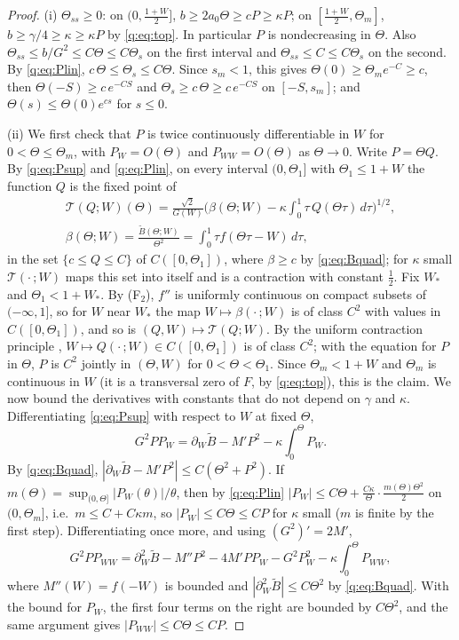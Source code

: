 \documentclass[11pt]{amsart}
\theoremstyle{definition}
\theoremstyle{remark}
\begin{document}
\begin{proof}
(i) $\Theta_{ss}\ge0$: on $(0,\frac{1+W}2]$, $b\ge2a_0\Theta\ge cP\ge\kappa P$; on
$[\frac{1+W}2,\Theta_m]$, $b\ge\gamma/4\ge\kappa\ge\kappa P$ by \eqref{q:eq:top}. In particular $P$ is
nondecreasing in $\Theta$. Also $\Theta_{ss}\le b/G^2\le C\Theta\le C\Theta_s$ on the first interval
and $\Theta_{ss}\le C\le C\Theta_s$ on the second. By \eqref{q:eq:Plin}, $c\,\Theta\le\Theta_s\le C\Theta$. Since $s_m<1$, this gives
$\Theta(0)\ge\Theta_me^{-C}\ge c$, then $\Theta(-S)\ge c\,e^{-CS}$ and
$\Theta_s\ge c\,\Theta\ge c\,e^{-CS}$ on $[-S,s_m]$; and $\Theta(s)\le\Theta(0)e^{cs}$ for $s\le0$.

(ii) We first check that $P$ is twice continuously differentiable in $W$ for
$0<\Theta\le\Theta_m$, with $P_W=O(\Theta)$ and $P_{WW}=O(\Theta)$ as $\Theta\to0$. Write
$P=\Theta Q$. By \eqref{q:eq:Psup} and \eqref{q:eq:Plin}, on every interval $(0,\Theta_1]$
with $\Theta_1\le1+W$ the function $Q$ is the fixed point of
\begin{gather*}
\mathcal T(Q;W)(\Theta)=\frac{\sqrt2}{G(W)}\Big(\beta(\Theta;W)-\kappa\int_0^1\tau\,Q(\Theta\tau)\,d\tau\Big)^{1/2},\\
\beta(\Theta;W)=\frac{\tilde B(\Theta;W)}{\Theta^2}=\int_0^1\tau f(\Theta\tau-W)\,d\tau,
\end{gather*}
in the set $\{c\le Q\le C\}$ of $C([0,\Theta_1])$, where $\beta\ge c$ by \eqref{q:eq:Bquad}; for
$\kappa$ small $\mathcal T(\cdot\,;W)$ maps this set into itself and is a contraction with
constant $\frac12$. Fix $W_*$ and $\Theta_1<1+W_*$. By (F$_2$), $f''$ is uniformly
continuous on compact subsets of $(-\infty,1]$, so for $W$ near $W_*$ the map
$W\mapsto\beta(\cdot\,;W)$ is of class $C^2$ with values in $C([0,\Theta_1])$, and so is
$(Q,W)\mapsto\mathcal T(Q;W)$. By the uniform contraction principle
\cite[Section~2.2]{ChowHale1982}, $W\mapsto Q(\cdot\,;W)\in C([0,\Theta_1])$ is of class
$C^2$; with the equation for $P$ in $\Theta$, $P$ is $C^2$ jointly in $(\Theta,W)$ for
$0<\Theta<\Theta_1$. Since $\Theta_m<1+W$ and $\Theta_m$ is continuous in $W$ (it is a
transversal zero of $F$, by \eqref{q:eq:top}), this is the claim. We now bound the derivatives with
constants that do not depend on $\gamma$ and $\kappa$.
Differentiating \eqref{q:eq:Psup} with respect to $W$ at fixed $\Theta$,
\[
G^2PP_W=\partial_W\tilde B-M'P^2-\kappa\int_0^\Theta P_W .
\]
By \eqref{q:eq:Bquad}, $|\partial_W\tilde B-M'P^2|\le C(\Theta^2+P^2)$. If
$m(\Theta)=\sup_{(0,\Theta]}|P_W(\theta)|/\theta$, then by \eqref{q:eq:Plin}
$|P_W|\le C\Theta+\frac{C\kappa}{\Theta}\cdot\frac{m(\Theta)\Theta^2}2$ on $(0,\Theta_m]$, i.e.\
$m\le C+C\kappa m$, so $|P_W|\le C\Theta\le CP$ for $\kappa$ small ($m$ is finite by the
first step). Differentiating once more, and using $(G^2)'=2M'$,
\[
G^2PP_{WW}=\partial_W^2\tilde B-M''P^2-4M'PP_W-G^2P_W^2-\kappa\int_0^\Theta P_{WW} ,
\]
where $M''(W)=f(-W)$ is bounded and $|\partial_W^2\tilde B|\le C\Theta^2$ by
\eqref{q:eq:Bquad}. With the bound for $P_W$, the first four terms on the right are bounded
by $C\Theta^2$, and the same argument gives $|P_{WW}|\le C\Theta\le CP$.


\end{proof}
\end{document}
